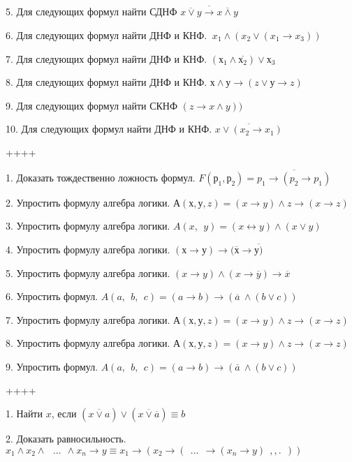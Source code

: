 5. Для следующих формул найти СДНФ \(\overline{\overline{x \vee y} \rightarrow \overline{x \land y}}\)

6. Для следующих формул найти ДНФ и КНФ. \(\ x_{1} \land (x_{2} \vee (x_{1} \rightarrow x_{3}))\)

7. Для следующих формул найти ДНФ и КНФ. \(\left( х_{1} \land \overline{х_{2}} \right) \vee х_{3}\)

8. Для следующих формул найти ДНФ и КНФ. \(х \land у \rightarrow (z \vee у \rightarrow z)\)

9. Для следующих формул найти СКНФ \((z \rightarrow x \land y))\)

10. Для следующих формул найти ДНФ и КНФ. \(\overline{x \vee (x_{2} \rightarrow x_{1})}\)

++++

1. Доказать тождественно ложность формул. \(F\left( р_{1},р_{2} \right) = \overline{p_{1} \rightarrow (p_{2} \rightarrow p_{1})}\)

2. Упростить формулу алгебра логики. \(А(х,у,z) = (x \rightarrow y) \land z \rightarrow (x \rightarrow z)\)

3. Упростить формулу алгебра логики. \(A(x,\ \ y) = (x \leftrightarrow y) \land (x \vee y)\)

4. Упростить формулу алгебра логики. \((х \rightarrow у) \rightarrow (\overline{х} \rightarrow \overline{у)}\)

5. Упростить формулу алгебра логики. \((x \rightarrow y) \land (x \rightarrow \overline{y}) \rightarrow \overline{x}\)

6. Упростить формул. \(A(a,\ \ b,\ \ c) = (a \rightarrow b) \rightarrow (\overline{a}\  \land (b \vee c))\)

7. Упростить формулу алгебра логики. \(А(х,у,z) = (x \rightarrow y) \land z \rightarrow (x \rightarrow z)\)

8. Упростить формулу алгебра логики. \(А(х,у,z) = (x \rightarrow y) \land z \rightarrow (x \rightarrow z)\)

9. Упростить формул. \(A(a,\ \ b,\ \ c) = (a \rightarrow b) \rightarrow (\overline{a}\  \land (b \vee c))\)

++++

1. Найти \(x\), если \(\left( \overline{x \vee a} \right) \vee \left( \overline{x \vee \overline{a}} \right) \equiv b\)

2. Доказать равносильность.\(x_{1} \land x_{2} \land \ \ \ ...\ \  \land x_{n} \rightarrow y \equiv x_{1} \rightarrow (x_{2} \rightarrow (\ \ ...\ \  \rightarrow (x_{n} \rightarrow y)\ \ ,,.\ \ ))\)

